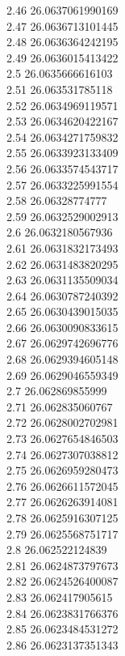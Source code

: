 {2.46	26.0637061990169\\
2.47	26.0636713101445\\
2.48	26.0636364242195\\
2.49	26.0636015413422\\
2.5	26.0635666616103\\
2.51	26.063531785118\\
2.52	26.0634969119571\\
2.53	26.0634620422167\\
2.54	26.0634271759832\\
2.55	26.0633923133409\\
2.56	26.0633574543717\\
2.57	26.0633225991554\\
2.58	26.06328774777\\
2.59	26.0632529002913\\
2.6	26.0632180567936\\
2.61	26.0631832173493\\
2.62	26.0631483820295\\
2.63	26.0631135509034\\
2.64	26.0630787240392\\
2.65	26.0630439015035\\
2.66	26.0630090833615\\
2.67	26.0629742696776\\
2.68	26.0629394605148\\
2.69	26.0629046559349\\
2.7	26.062869855999\\
2.71	26.062835060767\\
2.72	26.0628002702981\\
2.73	26.0627654846503\\
2.74	26.0627307038812\\
2.75	26.0626959280473\\
2.76	26.0626611572045\\
2.77	26.0626263914081\\
2.78	26.0625916307125\\
2.79	26.0625568751717\\
2.8	26.062522124839\\
2.81	26.0624873797673\\
2.82	26.0624526400087\\
2.83	26.062417905615\\
2.84	26.0623831766376\\
2.85	26.0623484531272\\
2.86	26.0623137351343\\
}
